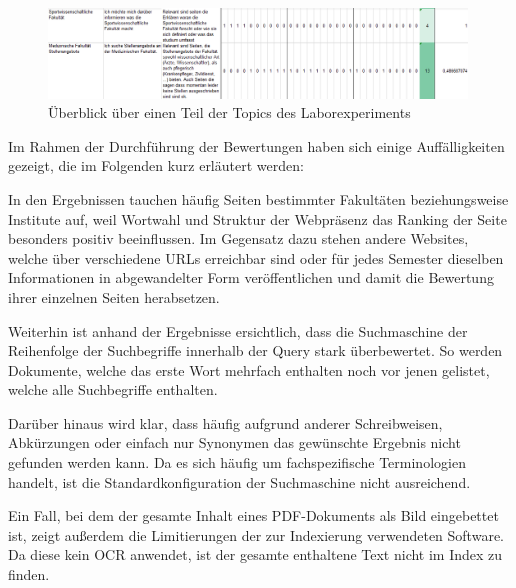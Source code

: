 \begin{figure}[!ht]
	\includegraphics[width=0.99\textwidth]{chapter_log_analysis/evaluation_topics.png}
	\caption{Überblick über einen Teil der Topics des Laborexperiments}
	\label{fig:labroratory_experiment}
\end{figure}



Im Rahmen der Durchführung der Bewertungen haben sich einige Auffälligkeiten gezeigt, die im Folgenden kurz erläutert werden: 

\begin{description}

\item In den Ergebnissen tauchen häufig Seiten bestimmter Fakultäten beziehungsweise Institute auf, weil Wortwahl und Struktur der Webpräsenz das Ranking der Seite besonders positiv beeinflussen. Im Gegensatz dazu stehen andere Websites, welche über verschiedene URLs erreichbar sind oder für jedes Semester dieselben Informationen in abgewandelter Form veröffentlichen und damit die Bewertung ihrer einzelnen Seiten herabsetzen.

\item Weiterhin ist anhand der Ergebnisse ersichtlich, dass die Suchmaschine der Reihenfolge der Suchbegriffe innerhalb der Query stark überbewertet. So werden Dokumente, welche das erste Wort mehrfach enthalten noch vor jenen gelistet, welche alle Suchbegriffe enthalten.

\item Darüber hinaus wird klar, dass häufig aufgrund anderer Schreibweisen, Abkürzungen oder einfach nur Synonymen das gewünschte Ergebnis nicht gefunden werden kann. Da es sich häufig um fachspezifische Terminologien handelt, ist die Standardkonfiguration der Suchmaschine nicht ausreichend.

\item Ein Fall, bei dem der gesamte Inhalt eines PDF-Dokuments als Bild eingebettet ist, zeigt außerdem die Limitierungen der zur Indexierung verwendeten Software. Da diese kein OCR anwendet, ist der gesamte enthaltene Text nicht im Index zu finden.

\end{description}

